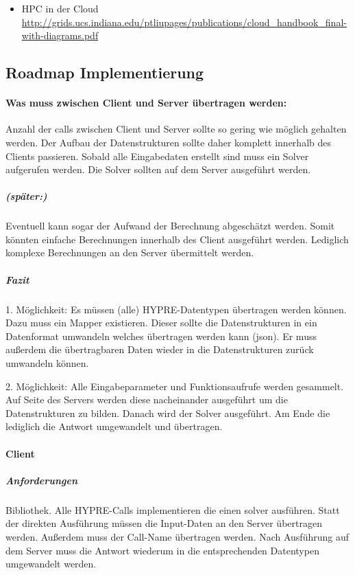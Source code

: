 \documentclass[a4paper,10pt]{article}
\numberwithin{figure}{section}
\numberwithin{table}{section}
\begin{document}
\begin{itemize}
 \item HPC in der Cloud \url{http://grids.ucs.indiana.edu/ptliupages/publications/cloud_handbook_final-with-diagrams.pdf}
\end{itemize}

\subsection{Roadmap Implementierung}


\paragraph{Was muss zwischen Client und Server übertragen werden:}

Anzahl der calls zwischen Client und Server sollte so gering wie möglich gehalten werden.
Der Aufbau der Datenstrukturen sollte daher komplett innerhalb des Clients passieren.
Sobald alle Eingabedaten erstellt sind muss ein Solver aufgerufen werden.
Die Solver sollten auf dem Server ausgeführt werden.

\subparagraph{(später:)}

Eventuell kann sogar der Aufwand der Berechnung abgeschätzt werden.
Somit könnten einfache Berechnungen innerhalb des Client ausgeführt werden.
Lediglich komplexe Berechnungen an den Server übermittelt werden.

\subparagraph{Fazit}

1. Möglichkeit:
Es müssen (alle) HYPRE-Datentypen übertragen werden können.
Dazu muss ein Mapper existieren.
Dieser sollte die Datenstrukturen in ein Datenformat umwandeln welches übertragen werden kann (json).
Er muss außerdem die übertragbaren Daten wieder in die Datenstrukturen zurück umwandeln können.

2. Möglichkeit:
Alle Eingabeparameter und Funktionsaufrufe werden gesammelt.
Auf Seite des Servers werden diese nacheinander ausgeführt um die Datenstrukturen zu bilden.
Danach wird der Solver ausgeführt.
Am Ende die lediglich die Antwort umgewandelt und übertragen.

\paragraph{Client}

\subparagraph{Anforderungen}

Bibliothek.
Alle HYPRE-Calls implementieren die einen solver ausführen.
Statt der direkten Ausführung müssen die Input-Daten an den Server übertragen werden.
Außerdem muss der Call-Name übertragen werden.
Nach Ausführung auf dem Server muss die Antwort wiederum in die entsprechenden Datentypen umgewandelt werden.
\end{document}
